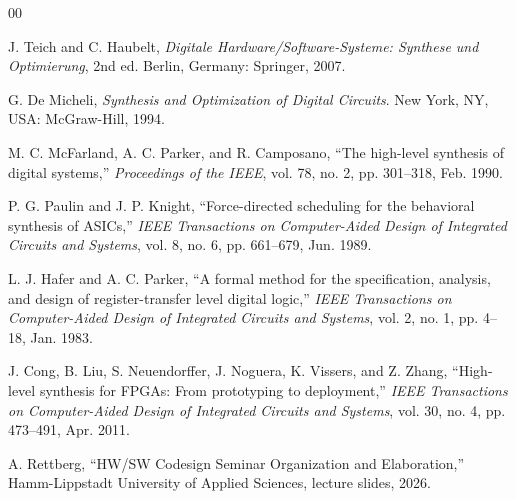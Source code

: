 \documentclass[conference]{IEEEtran}
\begin{document}
	\begin{thebibliography}{00}
		
		J. Teich and C. Haubelt, \emph{Digitale Hardware/Software-Systeme: Synthese und Optimierung}, 2nd ed. Berlin, Germany: Springer, 2007.
		
		G. De Micheli, \emph{Synthesis and Optimization of Digital Circuits}. New York, NY, USA: McGraw-Hill, 1994.
		
		M. C. McFarland, A. C. Parker, and R. Camposano, ``The high-level synthesis of digital systems,'' \emph{Proceedings of the IEEE}, vol. 78, no. 2, pp. 301--318, Feb. 1990.
		
		P. G. Paulin and J. P. Knight, ``Force-directed scheduling for the behavioral synthesis of ASICs,'' \emph{IEEE Transactions on Computer-Aided Design of Integrated Circuits and Systems}, vol. 8, no. 6, pp. 661--679, Jun. 1989.
		
		L. J. Hafer and A. C. Parker, ``A formal method for the specification, analysis, and design of register-transfer level digital logic,'' \emph{IEEE Transactions on Computer-Aided Design of Integrated Circuits and Systems}, vol. 2, no. 1, pp. 4--18, Jan. 1983.
		
		J. Cong, B. Liu, S. Neuendorffer, J. Noguera, K. Vissers, and Z. Zhang, ``High-level synthesis for FPGAs: From prototyping to deployment,'' \emph{IEEE Transactions on Computer-Aided Design of Integrated Circuits and Systems}, vol. 30, no. 4, pp. 473--491, Apr. 2011.
		
		A. Rettberg, ``HW/SW Codesign Seminar Organization and Elaboration,'' Hamm-Lippstadt University of Applied Sciences, lecture slides, 2026.
		
	\end{thebibliography}
	
\end{document}
